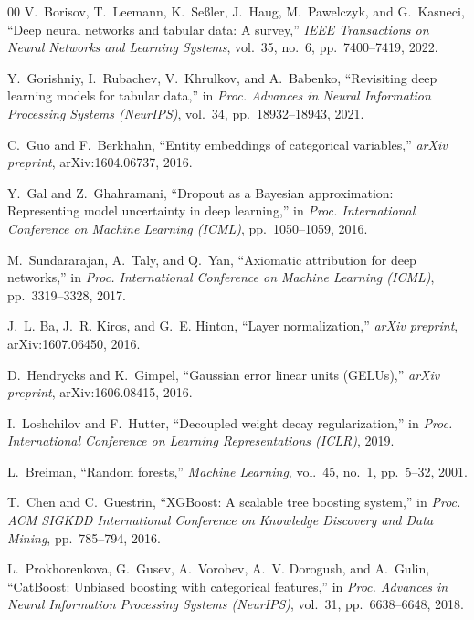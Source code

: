 \documentclass[conference,10pt,letterpaper]{IEEEtran}
\begin{document}
\begin{thebibliography}{00}
V.~Borisov, T.~Leemann, K.~Se{\ss}ler, J.~Haug, M.~Pawelczyk, and G.~Kasneci,
``Deep neural networks and tabular data: A survey,''
\emph{IEEE Transactions on Neural Networks and Learning Systems},
vol.~35, no.~6, pp.~7400--7419, 2022.

Y.~Gorishniy, I.~Rubachev, V.~Khrulkov, and A.~Babenko,
``Revisiting deep learning models for tabular data,''
in \emph{Proc. Advances in Neural Information Processing Systems (NeurIPS)},
vol.~34, pp.~18932--18943, 2021.

C.~Guo and F.~Berkhahn,
``Entity embeddings of categorical variables,''
\emph{arXiv preprint}, arXiv:1604.06737, 2016.

Y.~Gal and Z.~Ghahramani,
``Dropout as a Bayesian approximation: Representing model uncertainty in
deep learning,''
in \emph{Proc. International Conference on Machine Learning (ICML)},
pp.~1050--1059, 2016.

M.~Sundararajan, A.~Taly, and Q.~Yan,
``Axiomatic attribution for deep networks,''
in \emph{Proc. International Conference on Machine Learning (ICML)},
pp.~3319--3328, 2017.

J.~L. Ba, J.~R. Kiros, and G.~E. Hinton,
``Layer normalization,''
\emph{arXiv preprint}, arXiv:1607.06450, 2016.

D.~Hendrycks and K.~Gimpel,
``Gaussian error linear units (GELUs),''
\emph{arXiv preprint}, arXiv:1606.08415, 2016.

I.~Loshchilov and F.~Hutter,
``Decoupled weight decay regularization,''
in \emph{Proc. International Conference on Learning Representations (ICLR)}, 2019.

L.~Breiman,
``Random forests,''
\emph{Machine Learning}, vol.~45, no.~1, pp.~5--32, 2001.

T.~Chen and C.~Guestrin,
``XGBoost: A scalable tree boosting system,''
in \emph{Proc. ACM SIGKDD International Conference on Knowledge Discovery
and Data Mining}, pp.~785--794, 2016.

L.~Prokhorenkova, G.~Gusev, A.~Vorobev, A.~V. Dorogush, and A.~Gulin,
``CatBoost: Unbiased boosting with categorical features,''
in \emph{Proc. Advances in Neural Information Processing Systems (NeurIPS)},
vol.~31, pp.~6638--6648, 2018.


\end{thebibliography}
\end{document}
